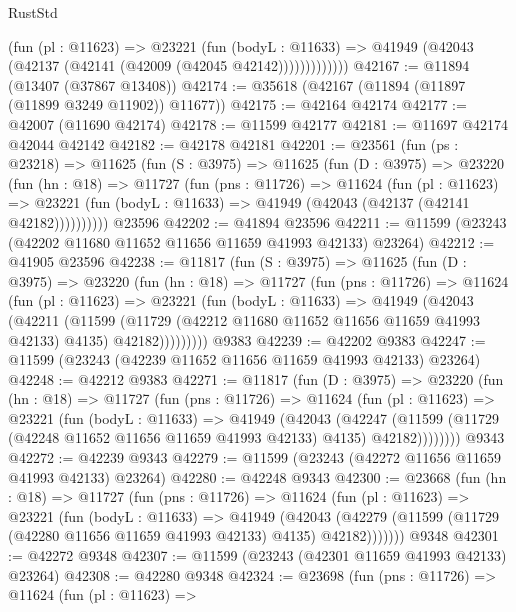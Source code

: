 \begin{lexlean}{RustStd}
\begin{coremodule}
                (fun (pl : @11623) =>
                @23221
                  (fun (bodyL : @11633) =>
                  @41949 (@42043 (@42137 (@42141 (@42009 (@42045 @42142)))))))))))))
@42167 := @11894 (@13407 (@37867 @13408))
@42174 := @35618 (@42167 (@11894 (@11897 (@11899 @3249 @11902)) @11677))
@42175 := @42164 @42174
@42177 := @42007 (@11690 @42174)
@42178 := @11599 @42177
@42181 := @11697 @42174 @42044 @42142
@42182 := @42178 @42181
@42201 := @23561
    (fun (ps : @23218) =>
    @11625
      (fun (S : @3975) =>
      @11625
        (fun (D : @3975) =>
        @23220
          (fun (hn : @18) =>
          @11727
            (fun (pns : @11726) =>
            @11624
              (fun (pl : @11623) =>
              @23221 (fun (bodyL : @11633) => @41949 (@42043 (@42137 (@42141 @42182))))))))))
    @23596
@42202 := @41894 @23596
@42211 := @11599 (@23243 (@42202 @11680 @11652 @11656 @11659 @41993 @42133) @23264)
@42212 := @41905 @23596
@42238 := @11817
    (fun (S : @3975) =>
    @11625
      (fun (D : @3975) =>
      @23220
        (fun (hn : @18) =>
        @11727
          (fun (pns : @11726) =>
          @11624
            (fun (pl : @11623) =>
            @23221
              (fun (bodyL : @11633) =>
              @41949
                (@42043
                  (@42211
                    (@11599
                      (@11729 (@42212 @11680 @11652 @11656 @11659 @41993 @42133) @4135)
                      @42182)))))))))
    @9383
@42239 := @42202 @9383
@42247 := @11599 (@23243 (@42239 @11652 @11656 @11659 @41993 @42133) @23264)
@42248 := @42212 @9383
@42271 := @11817
    (fun (D : @3975) =>
    @23220
      (fun (hn : @18) =>
      @11727
        (fun (pns : @11726) =>
        @11624
          (fun (pl : @11623) =>
          @23221
            (fun (bodyL : @11633) =>
            @41949
              (@42043
                (@42247
                  (@11599 (@11729 (@42248 @11652 @11656 @11659 @41993 @42133) @4135) @42182))))))))
    @9343
@42272 := @42239 @9343
@42279 := @11599 (@23243 (@42272 @11656 @11659 @41993 @42133) @23264)
@42280 := @42248 @9343
@42300 := @23668
    (fun (hn : @18) =>
    @11727
      (fun (pns : @11726) =>
      @11624
        (fun (pl : @11623) =>
        @23221
          (fun (bodyL : @11633) =>
          @41949
            (@42043
              (@42279 (@11599 (@11729 (@42280 @11656 @11659 @41993 @42133) @4135) @42182)))))))
    @9348
@42301 := @42272 @9348
@42307 := @11599 (@23243 (@42301 @11659 @41993 @42133) @23264)
@42308 := @42280 @9348
@42324 := @23698
    (fun (pns : @11726) =>
    @11624
      (fun (pl : @11623) =>

\end{coremodule}
\end{lexlean}
